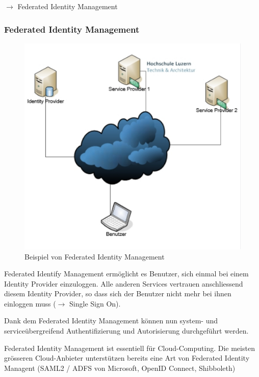 \documentclass[a4paper, 11pt]{article}
\begin{document}
$\rightarrow$ Federated Identity Management

\subsubsection{Federated Identity Management}

\begin{figure}
	\centering
	\includegraphics[keepaspectratio=true,height=15\baselineskip]{fim.jpg}
	\caption{Beispiel von Federated Identity Management}
	\label{fig:fim}
\end{figure}

Federated Identify Management ermöglicht es Benutzer, sich einmal bei einem Identity Provider einzuloggen. Alle anderen Services vertrauen anschliessend diesem Identity Provider, so dass sich der Benutzer nicht mehr bei ihnen einloggen muss ($\rightarrow$ Single Sign On).

Dank dem Federated Identity Management können nun system- und serviceübergreifend Authentifizierung und Autorisierung durchgeführt werden.

\vspace{10px}

\noindent Federated Identity Management ist essentiell für Cloud-Computing. Die meisten grösseren Cloud-Anbieter unterstützen bereits eine Art von Federated Identity Managent (SAML2 / ADFS von Microsoft, OpenID Connect, Shibboleth)
\end{document}
